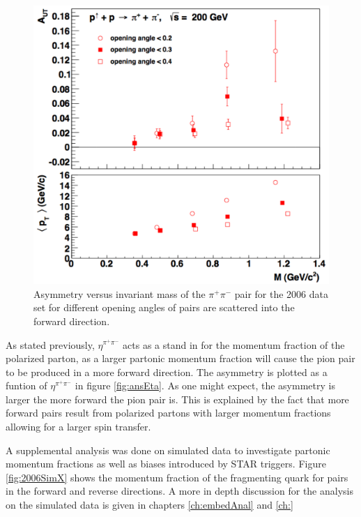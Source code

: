 \documentclass[abstract = on,listof=totoc, bibliography=totoc]{scrreprt}
\newcommand{\etapair}{\eta^{\pi^+\pi^-}}
\newcommand{\pip}{\pi^+}
\newcommand{\pim}{\pi^-}
\newcommand{\pair}{$\pip\pim$ }
\begin{document}
 \begin{figure}
\begin{center}
\includegraphics[width = 1\textwidth]{ansAngles_new}
\caption[$A_{UT}$ for different opening angles]{Asymmetry versus invariant mass of the \pair pair for the 2006 data set for different opening angles of pairs are scattered into the forward direction.}
\label{fig:ansAng}
\end{center}
\end{figure}

As stated previously, $\etapair$ acts as a stand in for the momentum fraction of the polarized parton, as a larger partonic momentum fraction will cause the pion pair to be produced in a more forward direction. The asymmetry is plotted as a funtion of $\etapair$ in figure \ref{fig:ansEta}. As one might expect, the asymmetry is larger the more forward the pion pair is. This is explained by the fact that more forward pairs result from polarized partons with larger momentum fractions allowing for a larger spin transfer. 

A supplemental analysis was done on simulated data to investigate partonic momentum fractions as well as biases introduced by STAR triggers. Figure \ref{fig:2006SimX} shows the momentum fraction of the fragmenting quark for pairs in the forward and reverse directions. A more in depth discussion for the analysis on the simulated data is given in chapters \ref{ch:embedAnal} and \ref{ch:}
\end{document}
